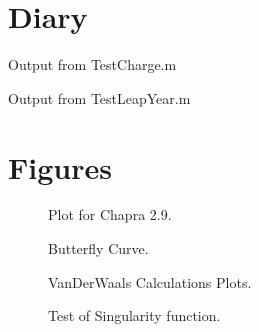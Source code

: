 \documentclass{article}
\begin{document}
\section{Diary}
\begin{table}[htb!]
\begin{center}
\caption{Output from TestCharge.m\label{ChargeTest}}
\end{center}
\end{table}

\begin{table}[htb!]
\begin{center}
\caption{Output from TestLeapYear.m\label{LeapYearsTest}}
\end{center}
\end{table}
\clearpage %

\section{Figures}

\begin{figure}[ht!]
\begin{center}
\caption{Plot for Chapra 2.9.\label{ChargeGraph}}
\end{center}
\end{figure}

\begin{figure}[ht!]
\begin{center}
\caption{Butterfly Curve.\label{ButterflyGraph}}
\end{center}
\end{figure}

\begin{figure}[ht!]
\begin{center}
\caption{VanDerWaals Calculations Plots.\label{PressureGraph}}
\end{center}
\end{figure}

\begin{figure}[ht!]
\begin{center}
\caption{Test of Singularity function.}
\end{center}
\end{figure}
\end{document}
